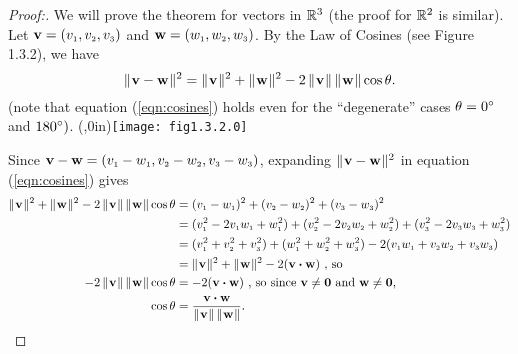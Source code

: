 \begin{proofbar}\begin{proof}[Proof:]
 We will prove the theorem for vectors in $\Real{3}$ (the proof for $\Real{2}$ is similar). Let
 $\textbf{v} = \vecthree{v}$ and $\textbf{w} = \vecthree{w}$. 
 By the Law of Cosines (see Figure 1.3.2), we
 have
 \begin{equation}\label{eqn:cosines}
  \norm{\textbf{v} - \textbf{w}}^2 = \norm{\textbf{v}}^2 + \norm{\textbf{w}}^2 -
  2\,\norm{\textbf{v}}\,\norm{\textbf{w}} \cos \theta.
 \end{equation}
 (note that equation (\ref{eqn:cosines}) holds even for the ``degenerate'' cases $\theta = 0\Degrees$ and $180\Degrees)$.
 \piccaption[]{}\parpic(\textwidth,0in){\texttt{[image: fig1.3.2.0]}\piccaptioninside}
 \par\mbox{}\newline\smallskip{}

 Since $\textbf{v} - \textbf{w} = \vecthreesub{v}{w}$, expanding $\norm{\textbf{v} - \textbf{w}}^2$
 in equation (\ref{eqn:cosines}) gives
 \begin{align*}
  \norm{\textbf{v}}^2 + \norm{\textbf{w}}^2 - 2\,\norm{\textbf{v}}\,\norm{\textbf{w}} \cos \theta &=
  (\ssub{v}{1} - \ssub{w}{1})^2 + (\ssub{v}{2} - \ssub{w}{2})^2 + (\ssub{v}{3} - \ssub{w}{3})^2\\
  &=
  (\ssub{v}{1}^2 - 2\ssub{v}{1}\ssub{w}{1} + \ssub{w}{1}^2) + (\ssub{v}{2}^2 - 2\ssub{v}{2}\ssub{w}{2} + \ssub{w}{2}^2)
  + (\ssub{v}{3}^2 - 2\ssub{v}{3}\ssub{w}{3} + \ssub{w}{3}^2)\\
  &= (\ssub{v}{1}^2 + \ssub{v}{2}^2 + \ssub{v}{3}^2) + (\ssub{w}{1}^2 + \ssub{w}{2}^2 + \ssub{w}{3}^2) -
  2(\ssub{v}{1}\ssub{w}{1} + \ssub{v}{2}\ssub{w}{2} + \ssub{v}{3}\ssub{w}{3})\\
  &=
  \norm{\textbf{v}}^2 + \norm{\textbf{w}}^2 - 2(\Dotprod{\textbf{v}}{\textbf{w}}) \text{~,~so}\\
  -2\,\norm{\textbf{v}}\,\norm{\textbf{w}} \cos \theta &= -2(\Dotprod{\textbf{v}}{\textbf{w}}) \text{~,~so since
  $\textbf{v} \ne \textbf{0}$ and $\textbf{w} \ne \textbf{0}$,}\\
  \cos \theta &= \frac{\Dotprod{\textbf{v}}{\textbf{w}}}{\norm{\textbf{v}} \, \norm{\textbf{w}}}.\qquad\qedhere
 \end{align*}
\end{proof}\end{proofbar}

